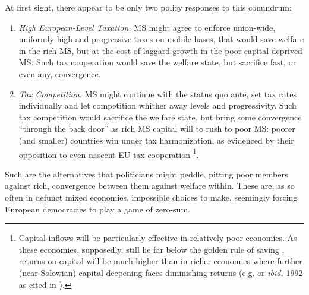 \documentclass[11pt,a4paper,oneside,openright]{article}
\begin{document}
At first sight, there appear to be only two policy responses to this conundrum:
\begin{enumerate}
	\item \emph{High European-Level Taxation.} \gls{MS} might agree to enforce union-wide, uniformly high and progressive taxes on mobile bases, that would save welfare in the rich \gls{MS}, but at the cost of laggard growth in the poor capital-deprived \gls{MS}. 
	Such tax cooperation would save the welfare state, but sacrifice fast, or even any, convergence.
	\item \emph{Tax Competition.} \gls{MS} might continue with the status quo ante, set tax rates individually and let competition whither away levels and progressivity. 
	Such tax competition would sacrifice the welfare state, but bring some convergence ``through the back door'' as rich \gls{MS} capital will to rush to poor \gls{MS}: 
	poorer (and smaller) countries win under tax harmonization, as evidenced by their opposition to even nascent \gls{EU} tax cooperation \citep[138]{Kellermann2009}
	\footnote{
		Capital inflows will be particularly effective in relatively poor economies. 
		As these economies, supposedly, still lie far below the golden rule of saving \citep{Solow1956}, returns on capital will be much higher than in richer economies where further (near-Solowian) capital deepening faces diminishing returns (e.g. \citealt{Barro1995} or \emph{ibid.} 1992 as cited in \citealt[3]{Beckfield2009}).
		}.
\end{enumerate}

Such are the alternatives that politicians might peddle, pitting poor members against rich, convergence between them against welfare within. 
These are, as so often in defunct mixed economies, impossible choices to make, seemingly forcing European democracies to play a game of zero-sum.
\end{document}
